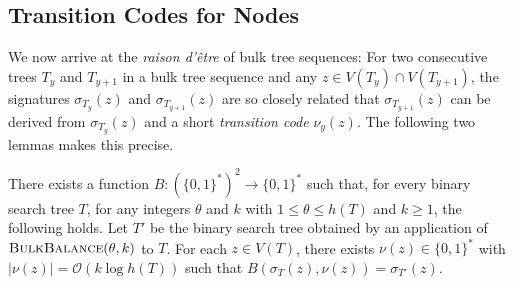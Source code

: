 \documentclass[kpfonts]{patmorin}
\newcommand{\Oh}{\mathcal{O}}
\let\leq\leqslant
\let\geq\geqslant
\begin{document}
\subsection{Transition Codes for Nodes}

We now arrive at the \emph{raison d'être} of bulk tree sequences:  For two consecutive trees $T_y$ and $T_{y+1}$ in a bulk tree sequence and any $z\in V(T_y)\cap V(T_{y+1})$, the signatures $\sigma_{T_y}(z)$ and $\sigma_{T_{y+1}}(z)$ are so closely related that $\sigma_{T_{y+1}}(z)$ can be derived from $\sigma_{T_y}(z)$ and a short \emph{transition code} $\nu_y(z)$.  The following two lemmas makes this precise.

\begin{lem}
  There exists a function $B:(\{0,1\}^*)^2\to\{0,1\}^*$ such that, 
  for every binary search tree $T$, for any integers $\theta$ and $k$ with $1\leq \theta \leq h(T)$ and $k\geq1$, the following holds.
  Let $T'$ be the binary search tree obtained by an application of $\textsc{BulkBalance}(\theta,k)$ to $T$.
  For each $z\in V(T)$, there exists $\nu(z)\in\{0,1\}^*$ with $|\nu(z)| = \Oh(k\log h(T))$ such that $B(\sigma_{T}(z), \nu(z)) = \sigma_{T'}(z)$.
\end{lem}
\end{document}
